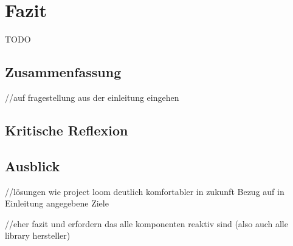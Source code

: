 \section{Fazit}
\label{sec:fazit}
TODO
\subsection{Zusammenfassung}
//auf fragestellung aus der einleitung eingehen
\subsection{Kritische Reflexion}
\subsection{Ausblick}
//lösungen wie project loom deutlich komfortabler in  zukunft
Bezug auf in Einleitung angegebene Ziele


//eher fazit
und erfordern das alle komponenten reaktiv sind (also auch alle library hersteller)
